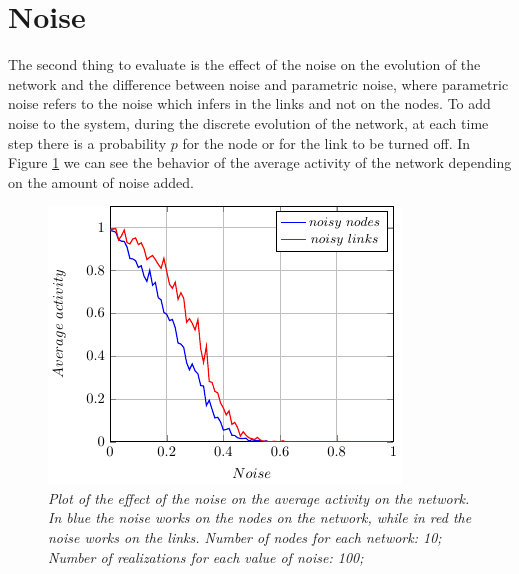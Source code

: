 \section{Noise}
The second thing to evaluate is the effect of the noise on the evolution of the network and the difference between noise and parametric noise, where parametric noise refers to the noise which infers in the links and not on the nodes.
To add noise to the system, during the discrete evolution of the network, at each time step there is a probability $p$ for the node or for the link to be turned off.
In Figure \ref{fig:noise} we can see the behavior of the average activity of the network depending on the amount of noise added.
\begin{figure}[h]
\centering
\includegraphics[scale=1.5]{images/noise.pdf}
\caption{\emph{Plot of the effect of the noise on the average activity on the network. In blue the noise works on the nodes on the network, while in red the noise works on the links. Number of nodes for each network: 10; Number of realizations for each value of noise: 100; }}
\label{fig:noise}
\end{figure}
